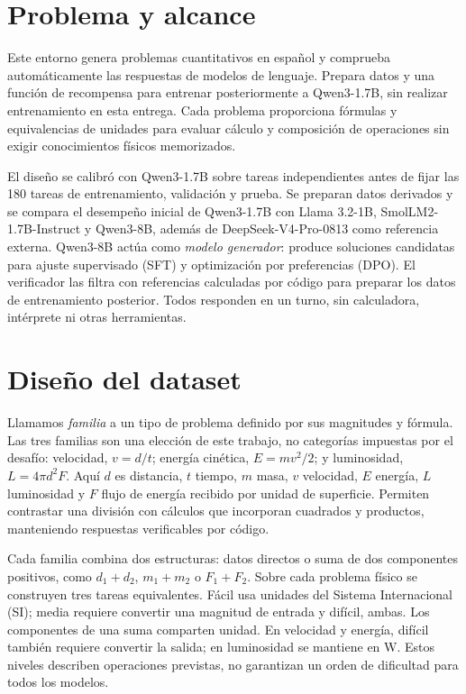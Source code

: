\section{Problema y alcance}
Este entorno genera problemas cuantitativos en español y comprueba automáticamente
las respuestas de modelos de lenguaje. Prepara datos y una función de recompensa
para entrenar posteriormente a Qwen3-1.7B, sin realizar entrenamiento en esta
entrega. Cada problema proporciona fórmulas y equivalencias de unidades para
evaluar cálculo y composición de operaciones sin exigir conocimientos físicos memorizados.

El diseño se calibró con Qwen3-1.7B sobre tareas independientes antes de fijar las
180 tareas de entrenamiento, validación y prueba. Se preparan datos derivados
y se compara el desempeño inicial de Qwen3-1.7B con Llama 3.2-1B,
SmolLM2-1.7B-Instruct y Qwen3-8B, además de DeepSeek-V4-Pro-0813 como referencia
externa. Qwen3-8B actúa como \emph{modelo generador}: produce soluciones
candidatas para ajuste supervisado (SFT) y optimización por preferencias (DPO).
El verificador las filtra con referencias calculadas por código para preparar
los datos de entrenamiento posterior.
Todos responden en un turno, sin calculadora, intérprete ni otras herramientas.

\section{Diseño del dataset}
Llamamos \emph{familia} a un tipo de problema definido por sus magnitudes y
fórmula. Las tres familias son una elección de este trabajo, no categorías
impuestas por el desafío: velocidad, $v=d/t$; energía cinética, $E=mv^2/2$;
y luminosidad, $L=4\pi d^2F$. Aquí $d$ es distancia, $t$ tiempo, $m$ masa,
$v$ velocidad, $E$ energía, $L$ luminosidad y $F$ flujo de energía recibido por unidad de superficie.
Permiten contrastar una división con cálculos que incorporan cuadrados y
productos, manteniendo respuestas verificables por código.

Cada familia combina dos estructuras: datos directos o suma de dos componentes
positivos, como $d_1+d_2$, $m_1+m_2$ o $F_1+F_2$. Sobre cada problema físico
se construyen tres tareas equivalentes. Fácil usa unidades del Sistema
Internacional (SI); media requiere convertir una magnitud de entrada y difícil,
ambas. Los componentes de una suma comparten unidad. En velocidad y energía,
difícil también requiere convertir la salida; en luminosidad se mantiene en W.
Estos niveles describen operaciones previstas, no garantizan un orden de
dificultad para todos los modelos.

